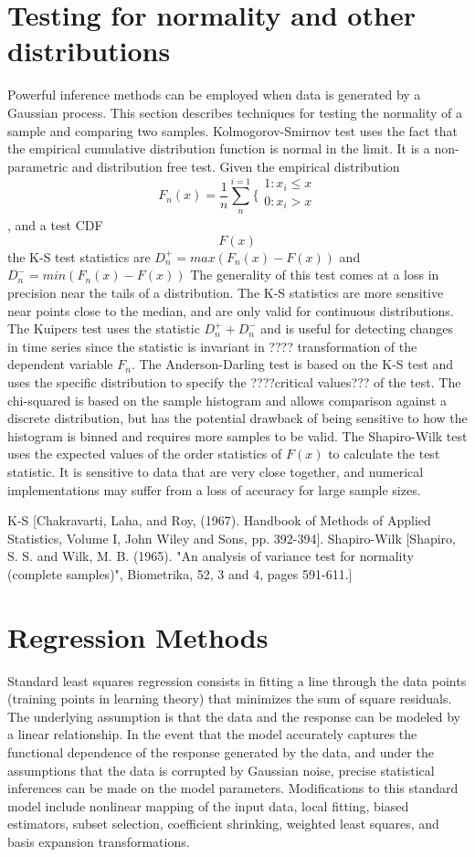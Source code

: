 \section{Testing for normality and other distributions } Powerful inference methods can be employed when data is generated by a Gaussian process. This section describes techniques for testing the normality of a sample and comparing two samples.  Kolmogorov-Smirnov test uses the fact that the empirical cumulative distribution function is normal in the limit. It is a non-parametric and distribution free test. Given the empirical distribution
 \[F_n(x) = \frac{1}{n} \sum\limits_{n}^{i=1} \biggl\{\begin{array}{c}1 :x_i\leq x \\0 : x_i>x\\ \end{array}\]
 , and a test CDF\[ F(x)\] the K-S test statistics are $D_n^+ = max(F_n(x)-F(x) ) $ and $D_n^- = min(F_n(x)-F(x) )$ The generality of this test comes at a loss in precision near the tails of a distribution.  The K-S statistics are more sensitive near points close to the median, and are only valid for continuous distributions.  The Kuipers test uses the statistic $D_n^+ + D_n^- $ and is useful for detecting changes in time series since the statistic is invariant in ???? transformation of the dependent variable $ F_n$.  The Anderson-Darling test is based on the K-S test and uses the specific distribution to specify the ????critical values??? of the test.  The chi-squared is based on the sample histogram and allows comparison against a discrete distribution, but has the potential drawback of being sensitive to how the histogram is binned and requires more samples to be valid.  The Shapiro-Wilk test uses the expected values of the order statistics of $F(x)$ to calculate the test statistic.  It is sensitive to data that are very close together, and numerical implementations may suffer from a loss of accuracy for large sample sizes.

 K-S [Chakravarti, Laha, and Roy, (1967). Handbook of Methods of Applied Statistics, Volume I, John Wiley and Sons, pp. 392-394].  Shapiro-Wilk [Shapiro, S. S. and Wilk, M. B. (1965). "An analysis of variance test for normality (complete samples)", Biometrika, 52, 3 and 4, pages 591-611.]


\section{Regression Methods}Standard least squares regression consists in fitting a line through the data points (training points in learning theory) that minimizes the sum of square residuals.  The underlying assumption is that the data and the response can be modeled by a linear relationship.  In the event that the model accurately captures the functional dependence of the response generated by the data, and under the assumptions that the data is corrupted by Gaussian noise, precise statistical inferences can be made on the model parameters.  Modifications to this standard model include nonlinear mapping of the input data, local fitting, biased estimators, subset selection, coefficient shrinking, weighted least squares, and basis expansion transformations.

